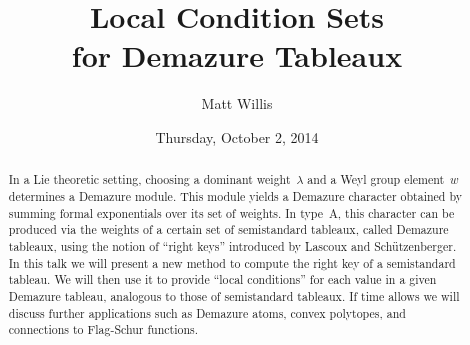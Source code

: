 \documentclass{UAmathtalk}
\author{Matt Willis}
\title{Local Condition Sets\\ for Demazure Tableaux}
\date{Thursday, October 2, 2014}
\begin{document}
\maketitle

\begin{abstract}
In a Lie theoretic setting, choosing a dominant weight~$\lambda$ and a Weyl group element~$w$ determines a Demazure module.
This module yields a Demazure character obtained by summing formal exponentials over its set of weights.
In type~A, this character can be produced via the weights of a certain set of semistandard tableaux, called Demazure tableaux, using the notion of ``right keys'' introduced by Lascoux and Sch\"utzenberger.
In this talk we will present a new method to compute the right key of a semistandard tableau.
We will then use it to provide ``local conditions'' for each value in a given Demazure tableau, analogous to those of semistandard tableaux.
If time allows we will discuss further applications such as Demazure atoms, convex polytopes, and connections to Flag-Schur functions.
\end{abstract}
\end{document}

